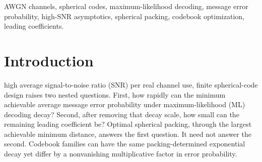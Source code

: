 \documentclass[12pt,draftclsnofoot,onecolumn]{IEEEtran}
\theoremstyle{definition}
\begin{document}
\begin{abstract}
We apply the developed theoretical framework to the simplex range,
\(2\leq M\leq n+1\), and the orthoplex-bound range, \(M=n+k\),
\(2\leq k\leq n\).  We obtain
\(K^{\ast}_{M,n}=K^{\mathrm{fix}}_{M,n}=M(M-1)\) for
\(2\leq M\leq n+1\).  For \(M=n+k\), \(2\leq k\leq n\), we prove
\(K^{\mathrm{fix}}_{n+k,n}=4n(k-1)\) and
\(K^{\ast}_{n+k,n}\leq4k(k-1)\).  For \(n\geq3\) and \(M=n+2\),
\(K^{\ast}_{n+2,n}=8<4n=K^{\mathrm{fix}}_{n+2,n}\), so the optimized
error is asymptotically smaller by the factor \(n/2\) than the best
packing-optimal error.  At the terminal endpoint \(k=n\),
\(K^{\ast}_{2n,n}=K^{\mathrm{fix}}_{2n,n}=4n(n-1)\).  For
\(3\leq k\leq n-1\), we conjecture that
\(K^{\ast}_{n+k,n}=4k(k-1)\).
\end{abstract}


\begin{IEEEkeywords}
AWGN channels, spherical codes, maximum-likelihood decoding, message error probability, high-SNR asymptotics, spherical packing, codebook optimization, leading coefficients.
\end{IEEEkeywords}



\section{Introduction}
\label{sec:introduction}

 high average signal-to-noise ratio (SNR) per real
channel use, finite spherical-code design raises two nested questions.
First, how rapidly can the minimum achievable average message error
probability under maximum-likelihood (ML) decoding decay?  Second, after
removing that decay scale, how small can the
remaining leading coefficient be?  Optimal spherical packing, through the
largest achievable minimum distance, answers the first question.  It need
not answer the second.  Codebook families can have the same
packing-determined exponential decay yet differ by a nonvanishing
multiplicative factor in error probability.
\end{document}
